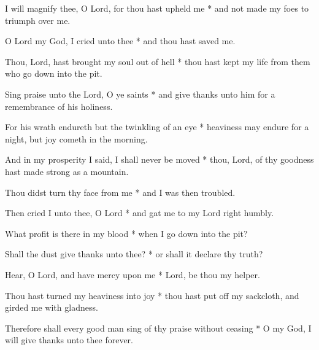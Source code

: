 I will magnify thee, O Lord, for thou hast upheld me * and not made my foes to triumph over me.

O Lord my God, I cried unto thee * and thou hast saved me.

Thou, Lord, hast brought my soul out of hell * thou hast kept my life from them who go down into the pit.

Sing praise unto the Lord, O ye saints * and give thanks unto him for a remembrance of his holiness.

For his wrath endureth but the twinkling of an eye * heaviness may endure for a night, but joy cometh in the morning.

And in my prosperity I said, I shall never be moved * thou, Lord, of thy goodness hast made strong as a mountain.

Thou didst turn thy face from me * and I was then troubled.

Then cried I unto thee, O Lord * and gat me to my Lord right humbly.

What profit is there in my blood * when I go down into the pit?

Shall the dust give thanks unto thee? * or shall it declare thy truth?

Hear, O Lord, and have mercy upon me * Lord, be thou my helper.

Thou hast turned my heaviness into joy * thou hast put off my sackcloth, and girded me with gladness.

Therefore shall every good man sing of thy praise without ceasing * O my God, I will give thanks unto thee forever.